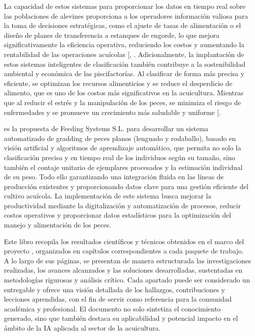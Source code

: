 \documentclass[a4paper,10pt,spanish]{jupyterBook}
\begin{document}
\sphinxAtStartPar
La capacidad de estos sistemas para proporcionar los datos en tiempo real sobre las poblaciones de alevines proporciona a los operadores información valiosa para la toma de decisiones estratégicas, como el ajuste de tasas de alimentación o el diseño de planes de transferencia a estanques de engorde, lo que mejora significativamente la eficiencia operativa, reduciendo los costos y aumentando la rentabilidad de las operaciones acuícolas {[}\sphinxhref{https://doi.org/10.3389/fmars.2021.823173}{Kandimalia et al., 2022}{]}, . Adicionalmente, la implantación de estos sistemas inteligentes de clasificación también contribuye a la sostenibilidad ambiental y económica de las piscifactorías. Al clasificar de forma más precisa y eficiente, se optimizan los recursos alimenticios y se reduce el desperdicio de alimento, que es uno de los costos más significativos en la acuicultura. Mientras que al reducir el estrés y la manipulación de los peces, se minimiza el riesgo de enfermedades y se promueve un crecimiento más saludable y uniforme {[}\sphinxhref{https://doi.org/10.1016/j.applanim.2006.09.001}{Ashley., 2007}{]}.

\sphinxAtStartPar
{} es la propuesta de Feeding Systems S.L. para desarrollar un sistema automatizado de gradding de peces planos (lenguado y rodaballo), basado en visión artificial y algoritmos de aprendizaje automático, que permita no solo la clasificación precisa y en tiempo real de los individuos según su tamaño, sino también el contaje unitario de ejemplares procesados y la estimación individual de su peso. Todo ello garantizando una integración fluida en las líneas de producción existentes y proporcionando datos clave para una gestión eficiente del cultivo acuícola. La implementación de este sistema busca mejorar la productividad mediante la digitalización y automatización de procesos, reducir costos operativos y proporcionar datos estadísticos para la optimización del manejo y alimentación de los peces.

\sphinxAtStartPar
Este libro recopila los resultados científicos y técnicos obtenidos en el marco del proyecto , organizados en capítulos correspondientes a cada paquete de trabajo. A lo largo de sus páginas, se presentan de manera estructurada las investigaciones realizadas, los avances alcanzados y las soluciones desarrolladas, sustentadas en metodologías rigurosas y análisis crítico. Cada apartado puede ser considerado un entregable y ofrece una visión detallada de los hallazgos, contribuciones y lecciones aprendidas, con el fin de servir como referencia para la comunidad académica y profesional. El documento no solo sintetiza el conocimiento generado, sino que también destaca su aplicabilidad y potencial impacto en el ámbito de la IA aplicada al sector de la acuicultura.
\end{document}
